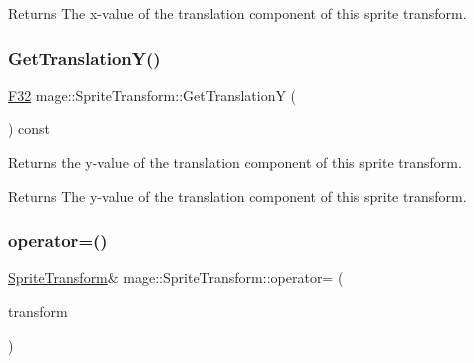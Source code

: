 \begin{DoxyReturn}{Returns}
The x-\/value of the translation component of this sprite transform. 
\end{DoxyReturn}
\hypertarget{classmage_1_1_sprite_transform_a45ac68b47fb751b8c3908524177c37c8}{}\label{classmage_1_1_sprite_transform_a45ac68b47fb751b8c3908524177c37c8} 
\subsubsection{\texorpdfstring{Get\+Translation\+Y()}{GetTranslationY()}}
{\footnotesize\ttfamily \hyperlink{namespacemage_aa97e833b45f06d60a0a9c4fc22ae02c0}{F32} mage\+::\+Sprite\+Transform\+::\+Get\+TranslationY (\begin{DoxyParamCaption}{ }\end{DoxyParamCaption}) const\hspace{0.3cm}{\ttfamily [noexcept]}}

Returns the y-\/value of the translation component of this sprite transform.

\begin{DoxyReturn}{Returns}
The y-\/value of the translation component of this sprite transform. 
\end{DoxyReturn}
\hypertarget{classmage_1_1_sprite_transform_af0adccff92d48e7b347e66277981ee07}{}\label{classmage_1_1_sprite_transform_af0adccff92d48e7b347e66277981ee07} 
\subsubsection{\texorpdfstring{operator=()}{operator=()}\hspace{0.1cm}{\footnotesize\ttfamily [1/2]}}
{\footnotesize\ttfamily \hyperlink{classmage_1_1_sprite_transform}{Sprite\+Transform}\& mage\+::\+Sprite\+Transform\+::operator= (\begin{DoxyParamCaption}\item[{const \hyperlink{classmage_1_1_sprite_transform}{Sprite\+Transform} \&}]{transform }\end{DoxyParamCaption})\hspace{0.3cm}{\ttfamily [default]}}

